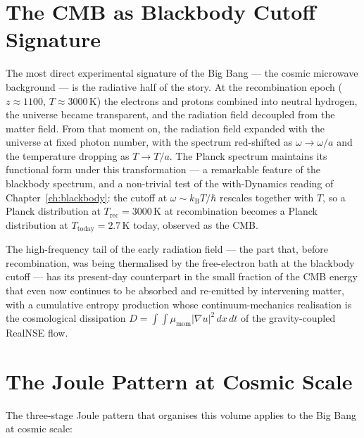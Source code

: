 \section{The CMB as Blackbody Cutoff Signature}

The most direct experimental signature of the Big Bang ---  the
cosmic microwave background --- is the radiative half of the story.
At the recombination epoch ($z \approx 1100$, $T \approx 3000\,\mathrm{K}$)
the electrons and protons combined into neutral hydrogen, the
universe became transparent, and the radiation field decoupled from
the matter field. From that moment on, the radiation field expanded
with the universe at fixed photon number, with the spectrum
red-shifted as $\omega \to \omega/a$ and the temperature dropping as
$T \to T/a$. The Planck spectrum maintains its functional form under
this transformation --- a remarkable feature of the blackbody
spectrum, and a non-trivial test of the with-Dynamics reading of
Chapter~\ref{ch:blackbody}: the cutoff at $\omega \sim
k_{\mathrm{B}}T/\hbar$ rescales together with $T$, so a Planck
distribution at $T_{\mathrm{rec}} = 3000\,\mathrm{K}$ at recombination
becomes a Planck distribution at $T_{\mathrm{today}} = 2.7\,\mathrm{K}$
today, observed as the CMB.

The high-frequency tail of the early radiation field --- the part
that, before recombination, was being thermalised by the
free-electron bath at the blackbody cutoff --- has its present-day
counterpart in the small fraction of the CMB energy that even now
continues to be absorbed and re-emitted by intervening matter, with a
cumulative entropy production whose continuum-mechanics realisation
is the cosmological dissipation $D = \int\!\int
\mu_{\mathrm{mom}}|\nabla u|^2\,dx\,dt$ of the gravity-coupled RealNSE
flow.

\section{The Joule Pattern at Cosmic Scale}

The three-stage Joule pattern that organises this volume applies to
the Big Bang at cosmic scale:

